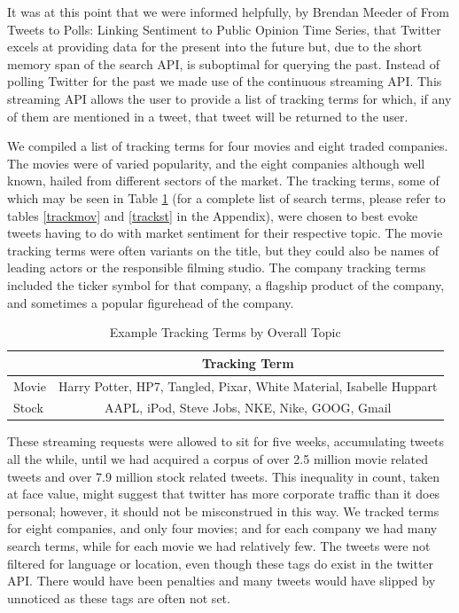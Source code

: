 \documentclass[11pt]{article}
\begin{document}
It was at this point that we were informed helpfully, by Brendan Meeder of From Tweets to Polls: Linking Sentiment to Public Opinion Time Series, that Twitter excels at providing data for the present into the future but, due to the short memory span of the search API, is suboptimal for querying the past. Instead of polling Twitter for the past we made use of the continuous streaming API. This streaming API allows the user to provide a list of tracking terms for which, if any of them are mentioned in a tweet, that tweet will be returned to the user.

We compiled a list of tracking terms for four movies and eight traded companies. The movies were of varied popularity, and the eight companies although well known, hailed from different sectors of the market. The tracking terms, some of which may be seen in Table \ref{tterms1} (for a complete list of search terms, please refer to tables \ref{trackmov} and \ref{trackst} in the Appendix), were chosen to best evoke tweets having to do with market sentiment for their respective topic. The movie tracking terms were often variants on the title, but they could also be names of leading actors or the responsible filming studio. The company tracking terms included the ticker symbol for that company, a flagship product of the company, and sometimes a popular figurehead of the company.

\begin{table}[htb!]
\centering
\caption{Example Tracking Terms by Overall Topic}
\begin{tabular}{|l|c|}
\hline
 & Tracking Term \\
\hline
Movie & Harry Potter, HP7, Tangled, Pixar, White Material, Isabelle Huppart\\
\hline
Stock & AAPL, iPod, Steve Jobs, NKE, Nike, GOOG, Gmail \\
\hline
\end{tabular}
\label{tterms1}
\end{table}

These streaming requests were allowed to sit for five weeks, accumulating tweets all the while, until we had acquired a corpus of over 2.5 million movie related tweets and over 7.9 million stock related tweets. This inequality in count, taken at face value, might suggest that twitter has more corporate traffic than it does personal; however, it should not be misconstrued in this way. We tracked terms for eight companies, and only four movies; and for each company we had many search terms, while for each movie we had relatively few. 
The tweets were not filtered for language or location, even though these tags do exist in the twitter API. There would have been penalties and many tweets would have slipped by unnoticed as these tags are often not set.
\end{document}
